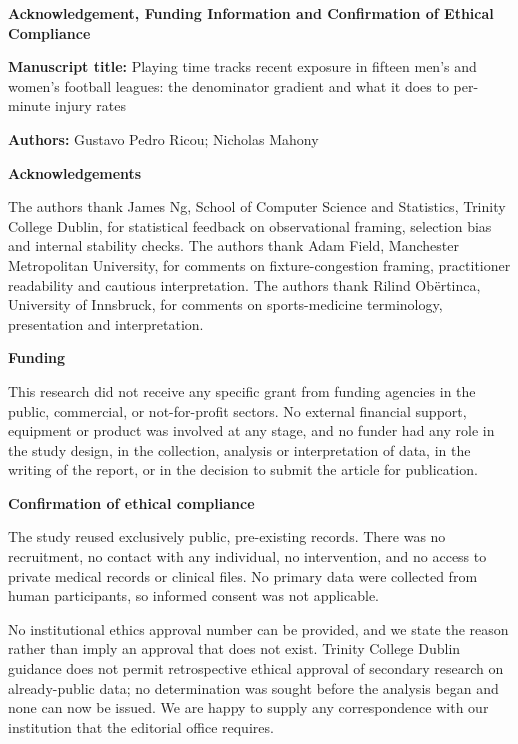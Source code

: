 \documentclass[11pt]{article}
\begin{document}
{\large\bfseries Acknowledgement, Funding Information and Confirmation of
Ethical Compliance\par}

\vspace{0.5em}

\textbf{Manuscript title:} Playing time tracks recent exposure in fifteen
men's and women's football leagues: the denominator gradient and what it
does to per-minute injury rates

\textbf{Authors:} Gustavo Pedro Ricou; Nicholas Mahony

\vspace{0.5em}

{\bfseries Acknowledgements}

The authors thank James Ng, School of Computer Science and Statistics, Trinity
College Dublin, for statistical feedback on observational framing, selection
bias and internal stability checks. The authors thank Adam Field, Manchester
Metropolitan University, for comments on fixture-congestion framing,
practitioner readability and cautious interpretation. The authors thank Rilind
Ob\"ertinca, University of Innsbruck, for comments on sports-medicine
terminology, presentation and interpretation.


{\bfseries Funding}

This research did not receive any specific grant from funding agencies in the
public, commercial, or not-for-profit sectors. No external financial support,
equipment or product was involved at any stage, and no funder had any role in
the study design, in the collection, analysis or interpretation of data, in
the writing of the report, or in the decision to submit the article for
publication.

{\bfseries Confirmation of ethical compliance}

The study reused exclusively public, pre-existing records. There was no
recruitment, no contact with any individual, no intervention, and no access to
private medical records or clinical files. No primary data were collected from
human participants, so informed consent was not applicable.

No institutional ethics approval number can be provided, and we state the
reason rather than imply an approval that does not exist. Trinity College
Dublin guidance does not permit retrospective ethical approval of secondary
research on already-public data; no determination was sought before the
analysis began and none can now be issued. We are happy to supply any
correspondence with our institution that the editorial office requires.
\end{document}
